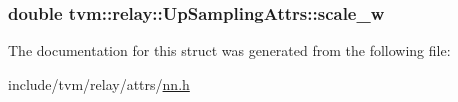 \subsubsection[{\texorpdfstring{scale\+\_\+w}{scale_w}}]{\setlength{\rightskip}{0pt plus 5cm}double tvm\+::relay\+::\+Up\+Sampling\+Attrs\+::scale\+\_\+w}\hypertarget{structtvm_1_1relay_1_1UpSamplingAttrs_af6c8568dcaaf3106502660a74b5847dd}{}\label{structtvm_1_1relay_1_1UpSamplingAttrs_af6c8568dcaaf3106502660a74b5847dd}


The documentation for this struct was generated from the following file\+:\begin{DoxyCompactItemize}
\item 
include/tvm/relay/attrs/\hyperlink{include_2tvm_2relay_2attrs_2nn_8h}{nn.\+h}\end{DoxyCompactItemize}
